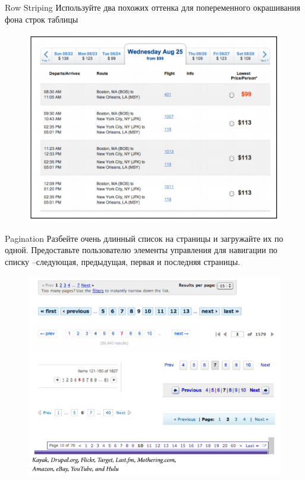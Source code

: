 \documentclass{beamer}
\begin{document}
\begin{frame}[t]{Row Striping}
	Используйте два похожих оттенка для попеременного окрашивания фона строк таблицы
	\begin{figure}[h]
		\centering
		\includegraphics[scale=0.5]{images/lec07-pic60.png}
	\end{figure}
\end{frame}	

\begin{frame}[t]{Pagination}
	Разбейте очень длинный список на страницы и загружайте их по одной. Предоставьте пользователю элементы управления для навигации по списку --следующая, предыдущая, первая и последняя страницы.
	\begin{figure}[h]
		\centering
		\includegraphics[scale=0.5]{images/lec07-pic62.png}
	\end{figure}
\end{frame}	
\end{document}
